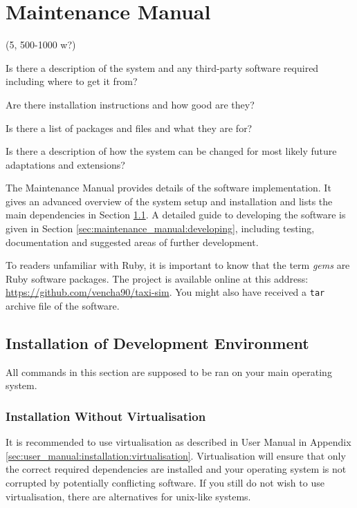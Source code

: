 \newpage
\section{Maintenance Manual}
\label{sec:maintenance_manual}

(5, 500-1000 w?)

Is there a description of the system and any third-party software required
including where to get it from?

Are there installation instructions and how good are they?

Is there a list of packages and files and what they are for?

Is there a description of how the system can be changed for most likely future
adaptations and extensions?


The Maintenance Manual provides details of the software implementation. It
gives an advanced overview of the system setup and installation and lists the
main dependencies in Section \ref{sec:maintenance_manual:installation}. A
detailed guide to developing the software is given in Section
\ref{sec:maintenance_manual:developing}, including testing, documentation and
suggested areas of further development.


 To readers unfamiliar with Ruby, it is important to know that the term
\textit{gems} are Ruby software packages. The project is available online at
this address: \url{https://github.com/vencha90/taxi-sim}. You might also have
received a \texttt{tar} archive file of the software.

\subsection{Installation of Development Environment}
\label{sec:maintenance_manual:installation}

All commands in this section are supposed to be ran on your main operating
system.


\subsubsection{Installation Without Virtualisation}
\label{sec:maintenance_manual:native_install}

It is recommended to use virtualisation as described in User Manual in Appendix
\ref{sec:user_manual:installation:virtualisation}. Virtualisation will ensure
that only the correct required dependencies are installed and your operating
system is not corrupted by potentially conflicting software. If you still do
not wish to use virtualisation, there are alternatives for unix-like systems.

